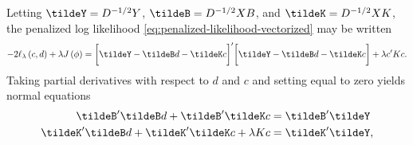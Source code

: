 %
%
Letting $\tildeY = D^{-1/2} Y$, $\tildeB = D^{-1/2} X B $, and $\tildeK = D^{-1/2} X K$, the penalized log likelihood \ref{eq:penalized-likelihood-vectorized} may be written
\begin{equation}\label{eq:penalized-loglik-tilde-vectorized}
-2\ell_\lambda \left(c, d \right) + \lambda J\left( \phi \right) = \bigg[ \tildeY - \tildeB d - \tildeK c\bigg]'\bigg[ \tildeY - \tildeB d - \tildeK c\bigg] + \lambda c'Kc.
\end{equation}
\noindent
Taking partial derivatives with respect to $d$ and $c$ and setting equal to zero yields normal equations 
\begin{align}
\begin{split}
\tildeB'\tildeB d + \tildeB'\tildeK c &= \tildeB' \tildeY \\
\tildeK'\tildeB d + \tildeK'\tildeK c + \lambda K c &= \tildeK' \tildeY, 
\end{split}
\end{align}

